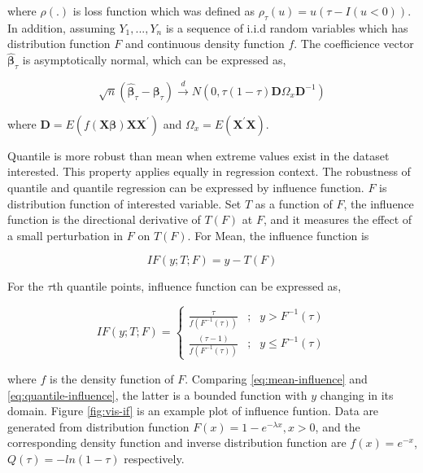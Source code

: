 \documentclass[article]{jss}
\theoremstyle{definition}
\theoremstyle{definition}
\theoremstyle{remark}
\begin{document}
where \(\rho(.)\) is loss function which was defined as
\(\rho_{\tau}(u)=u(\tau-I(u <0))\). In addition, assuming
\(Y_1,...,Y_n\) is a sequence of i.i.d random variables which has
distribution function \(F\) and continuous density function \(f\). The
coefficience vector \(\hat{\boldsymbol{\beta}}_{\tau}\) is
asymptotically normal, which can be expressed as,

\begin{equation}
\sqrt{n}(\hat{\boldsymbol{\beta}}_{\tau}-\boldsymbol{\beta}_{\tau}) \xrightarrow{d}
N(0,\tau(1-\tau)\boldsymbol{D}\boldsymbol{\varOmega}_{x}\boldsymbol{D}^{-1})
\label{eq:distrbution}
\end{equation}

where
\(\boldsymbol{D}=E(f(\boldsymbol{X}\boldsymbol{\beta})\boldsymbol{X}\boldsymbol{X}^{'})\)
and \(\boldsymbol{\varOmega}_{x}=E(\boldsymbol{X}^{'}\boldsymbol{X})\).

Quantile is more robust than mean when extreme values exist in the
dataset interested. This property applies equally in regression context.
The robustness of quantile and quantile regression can be expressed by
influence function. \(F\) is distribution function of interested
variable. Set \(T\) as a function of \(F\), the influence function is
the directional derivative of \(T(F)\) at \(F\), and it measures the
effect of a small perturbation in \(F\) on \(T(F)\). For Mean, the
influence function is

\begin{equation}
IF(y;T;F)=y-T(F)
\label{eq:mean-influence}
\end{equation}

For the \(\tau\)th quantile points, influence function can be expressed
as,

\begin{equation}
IF(y;T;F)=\left\{
\begin{aligned}
\frac{\tau}{f(F^{-1}(\tau))} & ; & y > F^{-1}(\tau) \\
\frac{(\tau-1)}{f(F^{-1}(\tau))} & ; & y \leq F^{-1}(\tau) 
\end{aligned}
\right.
\label{eq:quantile-influence}
\end{equation}

where \(f\) is the density function of \(F\). Comparing
\eqref{eq:mean-influence} and \eqref{eq:quantile-influence}, the latter is a
bounded function with \(y\) changing in its domain. Figure
\ref{fig:vis-if} is an example plot of influence funtion. Data are
generated from distribution function \(F(x)=1-e^{-\lambda x},x>0\), and
the corresponding density function and inverse distribution function are
\(f(x)=e^{-x}\), \(Q(\tau)=-ln(1-\tau)\) respectively.
\end{document}
